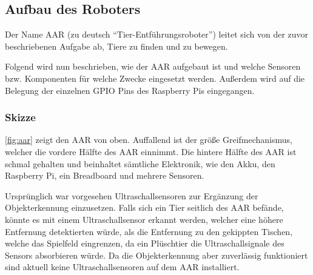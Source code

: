 \subsection{Aufbau des Roboters}

Der Name \ac{AAR} (zu deutsch \enquote{Tier-Entführungsroboter}) leitet sich von der zuvor beschriebenen Aufgabe ab, Tiere zu finden und zu bewegen.

Folgend wird nun beschrieben, wie der \ac{AAR} aufgebaut ist und welche Sensoren bzw. Komponenten für welche Zwecke eingesetzt werden.
Außerdem wird auf die Belegung der einzelnen \ac{GPIO} Pins des Raspberry Pis eingegangen.

\subsubsection{Skizze}


\autoref{fig:aar} zeigt den \ac{AAR} von oben.
Auffallend ist der größe Greifmechanismus, welcher die vordere Hälfte des \ac{AAR} einnimmt.
Die hintere Hälfte des \ac{AAR} ist schmal gehalten und beinhaltet sämtliche Elektronik, wie den Akku, den Raspberry Pi, ein Breadboard und mehrere Sensoren. 

Ursprünglich war vorgesehen Ultraschallsensoren zur Ergänzung der Objekterkennung einzusetzen.
Falls sich ein Tier seitlich des \ac{AAR} befände, könnte es mit einem Ultraschallsensor erkannt werden, welcher eine höhere Entfernung detektierten würde, als die Entfernung zu den gekippten Tischen, welche das Spielfeld eingrenzen, da ein Plüschtier die Ultraschallsignale des Sensors absorbieren würde.
Da die Objekterkennung aber zuverlässig funktioniert sind aktuell keine Ultraschallsensoren auf dem \ac{AAR} installiert.

